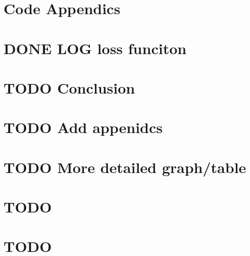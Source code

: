 \documentclass[a4paper,12pt]{article}
\begin{document}
\section{Code Appendics}
\label{sec:org7bca13d}
\section{{\bfseries\sffamily DONE} LOG loss funciton}
\label{sec:org40b25fb}
\section{{\bfseries\sffamily TODO} Conclusion}
\label{sec:org34969ef}
\section{{\bfseries\sffamily TODO} Add appenidcs}
\label{sec:orge48976d}
\section{{\bfseries\sffamily TODO} More detailed graph/table}
\label{sec:org9bdfb41}
\section{TODO}
\label{sec:org5a03067}
\section{TODO}
\label{sec:orgd7e9950}
\end{document}
